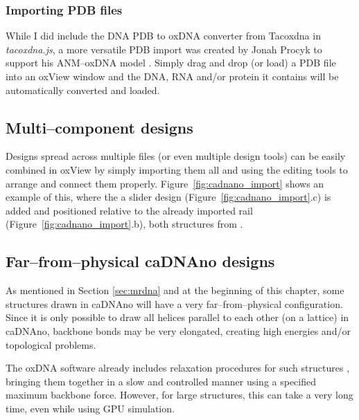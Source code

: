 \subsubsection{Importing PDB files}
While I did include the DNA PDB to oxDNA converter from Tacoxdna in \emph{tacoxdna.js}, a more versatile PDB import was created by Jonah Procyk to support his ANM--oxDNA model \cite{procyk2021coarse}. Simply drag and drop (or load) a PDB file into an oxView window and the DNA, RNA and/or protein it contains will be automatically converted and loaded.


\subsection{Multi--component designs}
Designs spread across multiple files (or even multiple design tools) can be easily combined in oxView by simply importing them all and using the editing tools to arrange and connect them properly. Figure~\ref{fig:cadnano_import} shows an example of this, where the a slider design (Figure~\ref{fig:cadnano_import}.c) is added and positioned relative to the already imported rail (Figure~\ref{fig:cadnano_import}.b), both structures from \cite{benson2021strategies}.

\subsection{Far--from--physical caDNAno designs}
As mentioned in Section \ref{sec:mrdna} and at the beginning of this chapter, some structures drawn in caDNAno will have a very far--from--physical configuration. Since it is only possible to draw all helices parallel to each other (on a lattice) in caDNAno, backbone bonds may be very elongated, creating high energies and/or topological problems.

The oxDNA software already includes relaxation procedures for such structures \cite{doye2020oxdna}, bringing them together in a slow and controlled manner using a specified maximum backbone force. However, for large structures, this can take a very long time, even while using GPU simulation.

